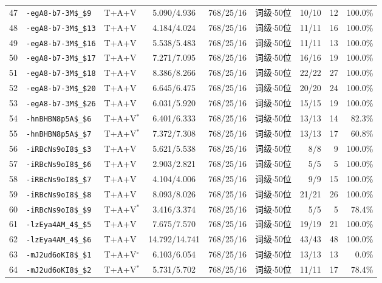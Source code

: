 \begin{longtable}{rllcccrrr}
47 & \texttt{-egA8-b7-3M\$\_\$9} & T+A+V & 5.090/4.936 & 768/25/16 & 词级$\cdot$50位 & 10/10 & 12 & 100.0\% \\
48 & \texttt{-egA8-b7-3M\$\_\$13} & T+A+V & 4.184/4.024 & 768/25/16 & 词级$\cdot$50位 & 11/11 & 16 & 100.0\% \\
49 & \texttt{-egA8-b7-3M\$\_\$16} & T+A+V & 5.538/5.483 & 768/25/16 & 词级$\cdot$50位 & 11/11 & 13 & 100.0\% \\
50 & \texttt{-egA8-b7-3M\$\_\$17} & T+A+V & 7.271/7.095 & 768/25/16 & 词级$\cdot$50位 & 16/16 & 19 & 100.0\% \\
51 & \texttt{-egA8-b7-3M\$\_\$18} & T+A+V & 8.386/8.266 & 768/25/16 & 词级$\cdot$50位 & 22/22 & 27 & 100.0\% \\
52 & \texttt{-egA8-b7-3M\$\_\$20} & T+A+V & 6.645/6.475 & 768/25/16 & 词级$\cdot$50位 & 20/20 & 24 & 100.0\% \\
53 & \texttt{-egA8-b7-3M\$\_\$26} & T+A+V & 6.031/5.920 & 768/25/16 & 词级$\cdot$50位 & 15/15 & 19 & 100.0\% \\
54 & \texttt{-hnBHBN8p5A\$\_\$6} & T+A+V$^{*}$ & 6.401/6.333 & 768/25/16 & 词级$\cdot$50位 & 13/13 & 14 & 82.3\% \\
55 & \texttt{-hnBHBN8p5A\$\_\$7} & T+A+V$^{*}$ & 7.372/7.308 & 768/25/16 & 词级$\cdot$50位 & 13/13 & 17 & 60.8\% \\
56 & \texttt{-iRBcNs9oI8\$\_\$3} & T+A+V & 5.621/5.538 & 768/25/16 & 词级$\cdot$50位 & 8/8 & 9 & 100.0\% \\
57 & \texttt{-iRBcNs9oI8\$\_\$6} & T+A+V & 2.903/2.821 & 768/25/16 & 词级$\cdot$50位 & 5/5 & 5 & 100.0\% \\
58 & \texttt{-iRBcNs9oI8\$\_\$7} & T+A+V & 4.104/4.006 & 768/25/16 & 词级$\cdot$50位 & 9/9 & 15 & 100.0\% \\
59 & \texttt{-iRBcNs9oI8\$\_\$8} & T+A+V & 8.093/8.026 & 768/25/16 & 词级$\cdot$50位 & 21/21 & 26 & 100.0\% \\
60 & \texttt{-iRBcNs9oI8\$\_\$9} & T+A+V$^{*}$ & 3.416/3.374 & 768/25/16 & 词级$\cdot$50位 & 5/5 & 5 & 78.4\% \\
61 & \texttt{-lzEya4AM\_4\$\_\$5} & T+A+V & 7.675/7.570 & 768/25/16 & 词级$\cdot$50位 & 19/19 & 21 & 100.0\% \\
62 & \texttt{-lzEya4AM\_4\$\_\$6} & T+A+V & 14.792/14.741 & 768/25/16 & 词级$\cdot$50位 & 43/43 & 48 & 100.0\% \\
63 & \texttt{-mJ2ud6oKI8\$\_\$1} & T+A+V$^{\circ}$ & 6.103/6.054 & 768/25/16 & 词级$\cdot$50位 & 13/13 & 13 & 0.0\% \\
64 & \texttt{-mJ2ud6oKI8\$\_\$2} & T+A+V$^{*}$ & 5.731/5.702 & 768/25/16 & 词级$\cdot$50位 & 11/11 & 17 & 78.4\% \\

\end{longtable}
